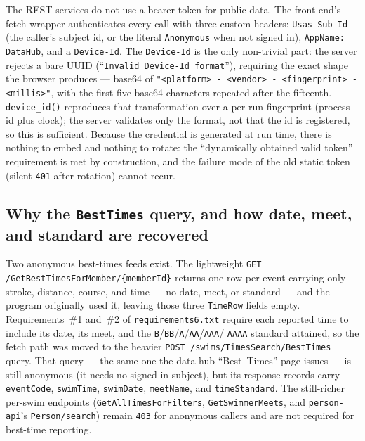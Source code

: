 \documentclass[12pt]{article}
\newcommand{\code}[1]{\texttt{#1}}
\begin{document}
The REST services do not use a bearer token for public data.  The
front-end's fetch wrapper authenticates every call with three custom
headers: \code{Usas-Sub-Id} (the caller's subject id, or the literal
\code{Anonymous} when not signed in), \code{AppName: DataHub}, and a
\code{Device-Id}.  The \code{Device-Id} is the only non-trivial part:
the server rejects a bare UUID (``\code{Invalid Device-Id format}''),
requiring the exact shape the browser produces --- base64 of
\code{"<platform> - <vendor> - <fingerprint> - <millis>"}, with the
first five base64 characters repeated after the fifteenth.
\code{device\_id()} reproduces that transformation over a per-run
fingerprint (process id plus clock); the server validates only the
format, not that the id is registered, so this is sufficient.  Because
the credential is generated at run time, there is nothing to embed and
nothing to rotate: the ``dynamically obtained valid token''
requirement is met by construction, and the failure mode of the old
static token (silent \code{401} after rotation) cannot recur.

\subsection{Why the \code{BestTimes} query, and how date, meet, and standard are recovered}
\label{sec:why-bestonly}

Two anonymous best-times feeds exist.  The lightweight
\code{GET /GetBestTimesForMember/\{memberId\}} returns one row per event
carrying only stroke, distance, course, and time --- no date, meet, or
standard --- and the program originally used it, leaving those three
\code{TimeRow} fields empty.  Requirements~\#1 and~\#2 of
\code{requirements6.txt} require each reported time to include its date,
its meet, and the \code{B}/\code{BB}/\code{A}/\code{AA}/\code{AAA}/%
\code{AAAA} standard attained, so the fetch path was moved to the
heavier \code{POST /swims/TimesSearch/BestTimes} query.  That query ---
the same one the data-hub ``Best~Times'' page issues --- is still
anonymous (it needs no signed-in subject), but its response records
carry \code{eventCode}, \code{swimTime}, \code{swimDate},
\code{meetName}, and \code{timeStandard}.  The still-richer per-swim
endpoints (\code{GetAllTimesForFilters}, \code{GetSwimmerMeets}, and
\code{person-api}'s \code{Person/search}) remain \code{403} for
anonymous callers and are not required for best-time reporting.
\end{document}
